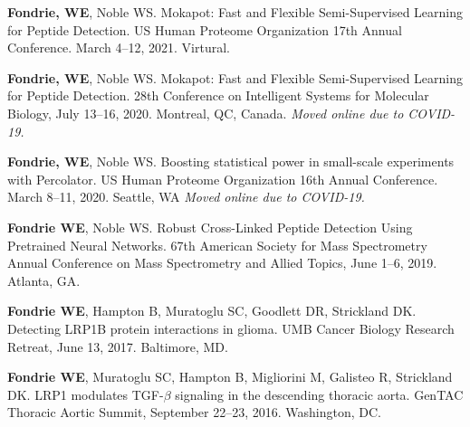 \documentclass[11pt]{article}
\newcommand{\mysection}[1]{\vspace{1ex \textbf{\large \textrm{#1}} \quad
    \hrulefill}}
\begin{document}
\mysection{Posters}
\begin{etaremune}
  \item \textbf{Fondrie, WE}, Noble WS. Mokapot: Fast and Flexible
  Semi-Supervised Learning for Peptide Detection. US Human Proteome
  Organization 17th Annual Conference. March 4--12, 2021. Virtural.

  \item \textbf{Fondrie, WE}, Noble WS. Mokapot: Fast and Flexible
  Semi-Supervised Learning for Peptide Detection. 28th Conference on
  Intelligent Systems for Molecular Biology, July 13--16, 2020. Montreal, QC,
  Canada. \textit{Moved online due to COVID-19.}
  
  \item \textbf{Fondrie, WE}, Noble WS. Boosting statistical power in
  small-scale experiments with Percolator. US Human Proteome Organization 16th
  Annual Conference. March 8--11, 2020. Seattle, WA \textit{Moved online due to
    COVID-19.}
  
  
  \item \textbf{Fondrie WE}, Noble WS. Robust Cross-Linked Peptide Detection
  Using Pretrained Neural Networks. 67th American Society for Mass Spectrometry
  Annual Conference on Mass Spectrometry and Allied Topics, June 1--6, 2019.
  Atlanta, GA.


  \item \textbf{Fondrie WE}, Hampton B, Muratoglu SC, Goodlett DR, Strickland
  DK. Detecting LRP1B protein interactions in glioma. UMB Cancer Biology
  Research Retreat, June 13, 2017. Baltimore, MD.

  \item \textbf{Fondrie WE}, Muratoglu SC, Hampton B, Migliorini M, Galisteo R,
  Strickland DK. LRP1 modulates TGF-$\beta$ signaling in the descending
  thoracic aorta. GenTAC Thoracic Aortic Summit, September 22--23, 2016.
  Washington, DC.


\end{etaremune}
\end{document}
